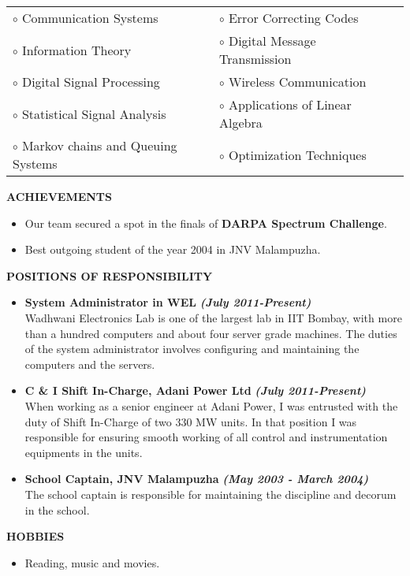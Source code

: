 \documentclass[a4paper,10pt]{article}
\begin{document}
 \begin{tabular}{p{3.5in}p{5in}p{3.5in}}
     $\circ$ Communication Systems		&$\circ$ Error Correcting Codes \\
    $\circ$ Information Theory			&$\circ$ Digital Message Transmission \\
    $\circ$ Digital Signal Processing		&$\circ$ Wireless Communication \\
    $\circ$ Statistical Signal Analysis	&$\circ$ Applications of Linear Algebra \\
    $\circ$ Markov chains and Queuing Systems	&$\circ$ Optimization Techniques \\
\end{tabular}

 \colorbox{titleColor}{\parbox{6.5in}{\textbf{ACHIEVEMENTS}}}

 \begin{itemize}
  \item Our team secured a spot in the finals of \textbf{DARPA Spectrum Challenge}.
 \item Best outgoing student of the year 2004 in JNV Malampuzha.
  \end{itemize}

 \colorbox{titleColor}{\parbox{6.5in}{\textbf{POSITIONS OF RESPONSIBILITY}}}

 \begin{itemize}
 \setlength{\itemsep}{1pt}
 \item \textbf{System Administrator in WEL} \textbf \emph{(July 2011-Present)} \\
Wadhwani Electronics Lab is one of the largest lab in IIT Bombay, with more than a hundred computers and about 
four server grade machines. The duties of the system administrator involves configuring and maintaining the
computers and the servers.

\item \textbf{C \& I Shift In-Charge, Adani Power Ltd} \textbf \emph{(July 2011-Present)} \\
When working as a senior engineer at Adani Power, I was entrusted with the duty of Shift In-Charge of two 330 MW units. In that position
I was responsible for ensuring smooth working of all control and instrumentation equipments in the units.

\item \textbf{School Captain, JNV Malampuzha} \textbf \emph{(May 2003 - March 2004)} \\
The school captain is responsible for maintaining the discipline and decorum in the school.
 \end{itemize}

 \colorbox{titleColor}{\parbox{6.5in}{\textbf{HOBBIES}}}

  \begin{itemize}
 \setlength{\itemsep}{1pt}
    \item Reading, music and movies.
  \end{itemize}
\end{document}
